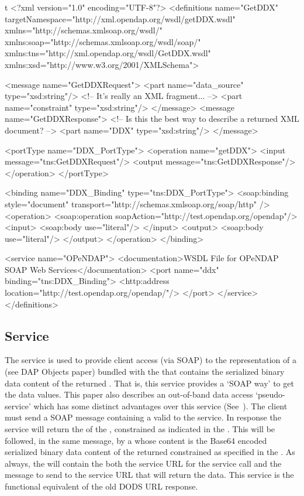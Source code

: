 \documentclass[justify]{dods-paper}
\begin{document}
\begin{vcode}{t}
<?xml version="1.0" encoding="UTF-8"?>
<definitions name="GetDDX"
   targetNamespace="http://xml.opendap.org/wsdl/getDDX.wsdl"
   xmlns="http://schemas.xmlsoap.org/wsdl/"
   xmlns:soap="http://schemas.xmlsoap.org/wsdl/soap/"
   xmlns:tns="http://xml.opendap.org/wsdl/GetDDX.wsdl"
   xmlns:xsd="http://www.w3.org/2001/XMLSchema">
 
   <message name="GetDDXRequest">
      <part name="data_source" type="xsd:string"/>
      <!-- It's really an XML fragment... -->
      <part name="constraint" type="xsd:string"/>
   </message>
   <message name="GetDDXResponse">
      <!-- Is this the best way to describe a returned XML document? -->
      <part name="DDX" type="xsd:string"/>
   </message>
 
   <portType name="DDX_PortType">
      <operation name="getDDX">
         <input message="tns:GetDDXRequest"/>
         <output message="tns:GetDDXResponse"/>
      </operation>
   </portType>

   <binding name="DDX_Binding" type="tns:DDX_PortType">
      <soap:binding style="document"
                    transport="http://schemas.xmlsoap.org/soap/http" />
      <operation>
         <soap:operation soapAction="http://test.opendap.org/opendap"/>
         <input>
            <soap:body use="literal"/>
         </input>
         <output>
            <soap:body use="literal"/>
         </output>
      </operation>
   </binding>
 
   <service name="OPeNDAP">
      <documentation>WSDL File for OPeNDAP SOAP Web Services</documentation>
        <port name="ddx" binding="tns:DDX_Binding">
           <http:address location="http://test.opendap.org/opendap/"/>
        </port>
   </service>
</definitions>
\end{vcode}


\subsection {\GetData Service}
\label {getData}

The \GetData service is used to provide client access (via SOAP) to
the \DDX representation of a \Dataset (see DAP Objects paper) bundled
with the \Blob that contains the serialized binary data content of the
returned \DDX. That is, this service provides a `SOAP way' to get the
data values. This paper also describes an out-of-band data access
`pseudo-service' which has some distinct advantages over this service
(See~). The client must send a SOAP message
containing a valid \CE to the service. In response the service will
return the \DDX of the \Dataset, constrained as indicated in the \CE.
This will be followed, in the same message, by a \blobdataelement
whose content is the Base64\cite{ietf:rfc2045} encoded serialized
binary data content of the returned \DDX constrained as specified in
the \CE. As always, the \DDX will contain the both the service URL for
the \GetBlob service call and the message to send to the service URL
that will return the \Blob data. This service is the functional
equivalent of the old DODS URL  response.
\end{document}
